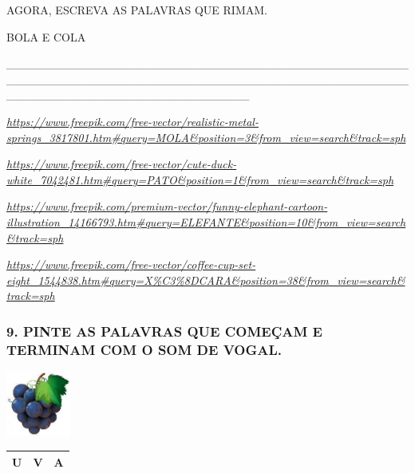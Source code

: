 AGORA, ESCREVA AS PALAVRAS QUE RIMAM.

BOLA E COLA

\_\_\_\_\_\_\_\_\_\_\_\_\_\_\_\_\_\_\_\_\_\_\_\_\_\_\_\_\_\_\_\_\_\_\_\_\_\_\_\_\_\_\_\_\_\_\_\_\_\_\_\_\_\_\_\_\_\_\_\_\_\_\_\_\_\_\_\_\_\_\_\_\_\_\_\_\_\_\_\_\_\_\_\_\_\_\_\_\_\_\_\_\_\_\_\_\_\_\_\_\_\_\_\_\_\_\_\_\_\_\_\_\_\_\_\_\_\_\_\_\_\_\_\_\_

\href{https://www.freepik.com/free-vector/realistic-metal-springs_3817801.htm\#query=MOLA\&position=3\&from_view=search\&track=sph}{\emph{https://www.freepik.com/free-vector/realistic-metal-springs\_3817801.htm\#query=MOLA\&position=3\&from\_view=search\&track=sph}}

\href{https://www.freepik.com/free-vector/cute-duck-white_7042481.htm\#query=PATO\&position=1\&from_view=search\&track=sph}{\emph{https://www.freepik.com/free-vector/cute-duck-white\_7042481.htm\#query=PATO\&position=1\&from\_view=search\&track=sph}}

\href{https://www.freepik.com/premium-vector/funny-elephant-cartoon-illustration_14166793.htm\#query=ELEFANTE\&position=10\&from_view=search\&track=sph}{\emph{https://www.freepik.com/premium-vector/funny-elephant-cartoon-illustration\_14166793.htm\#query=ELEFANTE\&position=10\&from\_view=search\&track=sph}}

\href{https://www.freepik.com/free-vector/coffee-cup-set-eight_1544838.htm\#query=X\%C3\%8DCARA\&position=38\&from_view=search\&track=sph}{\emph{https://www.freepik.com/free-vector/coffee-cup-set-eight\_1544838.htm\#query=X\%C3\%8DCARA\&position=38\&from\_view=search\&track=sph}}

\subsubsection{9. PINTE AS PALAVRAS QUE COMEÇAM E TERMINAM COM O SOM DE
VOGAL.}\label{pinte-as-palavras-que-comeuxe7a-e-terminam-com-o-som-de-vogal.}

\includegraphics[width=0.83333in,height=0.84004in]{media/image38.jpg}

\begin{longtable}[]{@{}lll@{}}
\toprule
U & V & A\tabularnewline
\bottomrule
\end{longtable}

